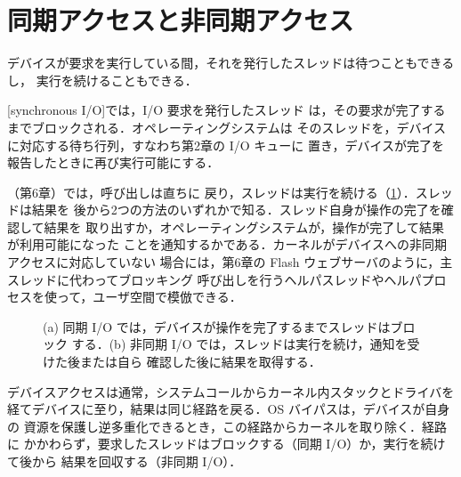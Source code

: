\documentclass[../main.tex]{subfiles}
\begin{document}
\section{同期アクセスと非同期アクセス}
\label{sec:l11-sync}

デバイスが要求を実行している間，それを発行したスレッドは待つこともできるし，
実行を続けることもできる．

\begin{definition}[同期 I/O]
  [synchronous I/O]では，I/O 要求を発行したスレッド
  は，その要求が完了するまでブロックされる．オペレーティングシステムは
  そのスレッドを，デバイスに対応する待ち行列，すなわち第2章の I/O キューに
  置き，デバイスが完了を報告したときに再び実行可能にする．
\end{definition}

（第6章）では，呼び出しは直ちに
戻り，スレッドは実行を続ける（\cref{fig:l11-sync-async}）．スレッドは結果を
後から2つの方法のいずれかで知る．スレッド自身が操作の完了を確認して結果を
取り出すか，オペレーティングシステムが，操作が完了して結果が利用可能になった
ことを通知するかである．カーネルがデバイスへの非同期アクセスに対応していない
場合には，第6章の Flash ウェブサーバのように，主スレッドに代わってブロッキング
呼び出しを行うヘルパスレッドやヘルパプロセスを使って，ユーザ空間で模倣できる．%

\begin{figure}[htbp]
  \centering
  
  \caption{(a) 同期 I/O では，デバイスが操作を完了するまでスレッドはブロック
    する．(b) 非同期 I/O では，スレッドは実行を続け，通知を受けた後または自ら
    確認した後に結果を取得する．}
  \label{fig:l11-sync-async}
\end{figure}

\begin{keypoint}
  デバイスアクセスは通常，システムコールからカーネル内スタックとドライバを
  経てデバイスに至り，結果は同じ経路を戻る．OS バイパスは，デバイスが自身の
  資源を保護し逆多重化できるとき，この経路からカーネルを取り除く．経路に
  かかわらず，要求したスレッドはブロックする（同期 I/O）か，実行を続けて後から
  結果を回収する（非同期 I/O）．
\end{keypoint}
\end{document}
